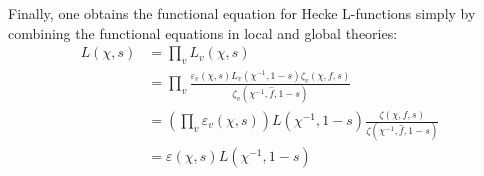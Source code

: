 \documentclass[10pt]{article}
\theoremstyle{plain}
\theoremstyle{remark}
\begin{document}
	Finally, one obtains the functional equation for Hecke L-functions simply by combining the functional equations in local and global theories:
	\begin{align*}
		L(\chi,s)&=\prod_vL_v(\chi,s)\\&=\prod_v\frac{\varepsilon_v(\chi,s)L_v(\chi^{-1},1-s)\zeta_v(\chi,f,s)}{\zeta_v(\chi^{-1},\widehat{f},1-s)}\\&=\left(\prod_v\varepsilon_v(\chi,s)\right)L(\chi^{-1},1-s)\frac{\zeta(\chi,f,s)}{\zeta(\chi^{-1},\widehat{f},1-s)}\\&=\varepsilon(\chi,s)L(\chi^{-1},1-s)
	\end{align*}


	
	
	
	
	
	
	
	
\end{document}
